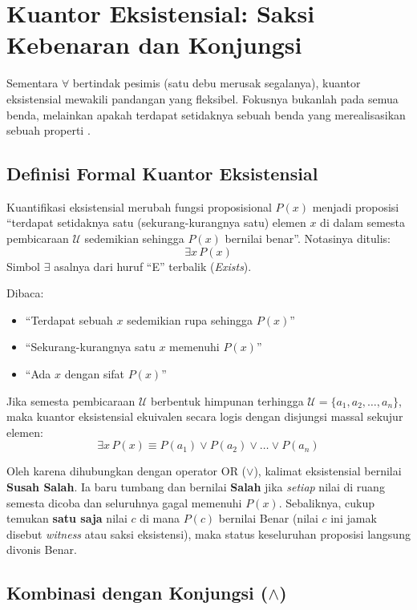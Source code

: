 \section{Kuantor Eksistensial: Saksi Kebenaran dan Konjungsi}

Sementara $\forall$ bertindak pesimis (satu debu merusak segalanya), kuantor eksistensial mewakili pandangan yang fleksibel. Fokusnya bukanlah pada semua benda, melainkan apakah terdapat setidaknya sebuah benda yang merealisasikan sebuah properti \cite{rosen2019}.

\subsection{Definisi Formal Kuantor Eksistensial}

\begin{definisi}
Kuantifikasi eksistensial merubah fungsi proposisional $P(x)$ menjadi proposisi ``terdapat setidaknya satu (sekurang-kurangnya satu) elemen $x$ di dalam semesta pembicaraan $\mathcal{U}$ sedemikian sehingga $P(x)$ bernilai benar''. Notasinya ditulis:
\[ \exists x \, P(x) \]
Simbol $\exists$ asalnya dari huruf ``E'' terbalik (\textit{Exists}).
\end{definisi}

Dibaca:
\begin{itemize}
    \item ``Terdapat sebuah $x$ sedemikian rupa sehingga $P(x)$''
    \item ``Sekurang-kurangnya satu $x$ memenuhi $P(x)$''
    \item ``Ada $x$ dengan sifat $P(x)$''
\end{itemize}

Jika semesta pembicaraan $\mathcal{U}$ berbentuk himpunan terhingga $\mathcal{U} = \{a_1, a_2, \ldots, a_n\}$, maka kuantor eksistensial ekuivalen secara logis dengan disjungsi massal sekujur elemen:
\[ \exists x \, P(x) \equiv P(a_1) \lor P(a_2) \lor \ldots \lor P(a_n) \]

Oleh karena dihubungkan dengan operator OR ($\lor$), kalimat eksistensial bernilai \textbf{Susah Salah}. Ia baru tumbang dan bernilai \textbf{Salah} jika \emph{setiap} nilai di ruang semesta dicoba dan seluruhnya gagal memenuhi $P(x)$. Sebaliknya, cukup temukan \textbf{satu saja} nilai $c$ di mana $P(c)$ bernilai Benar (nilai $c$ ini jamak disebut \textit{witness} atau saksi eksistensi), maka status keseluruhan proposisi langsung divonis Benar.

\subsection{Kombinasi dengan Konjungsi ($\wedge$)}

